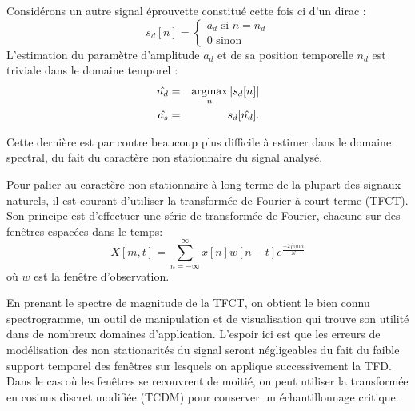 Considérons un autre signal \og éprouvette \fg constitué cette fois ci d'un dirac :
\begin{equation}
  s_d[n] = \begin{cases}
    a_d \text{ si } n=n_d \\
    0 \text{ sinon}
\end{cases}
\end{equation}
L'estimation du paramètre d'amplitude $a_d$ et de sa position temporelle $n_d$ est triviale dans le domaine temporel :
\begin{eqnarray}
  \hat{n_d} &=&  \operatorname*{argmax}_n | s_d[n] | \\
  \hat{a_s} &=&  s_d[\hat{n_d}].
\end{eqnarray}

Cette dernière est par contre beaucoup plus difficile à estimer dans le domaine spectral, du fait du caractère non stationnaire du signal analysé.

Pour palier au caractère non stationnaire à long terme de la plupart des signaux naturels, il est courant d'utiliser la transformée de Fourier à court terme (TFCT). Son principe est d'effectuer une série de transformée de Fourier, chacune sur des fenêtres espacées dans le temps:
\begin{equation}
X[m, t] = \sum_{n = - \infty}^{\infty} x[n] w[n-t] e^{\frac{-2 j  \pi m n}{N}}
\end{equation}
où $w$ est la fenêtre d'observation.


En prenant le spectre de magnitude de la TFCT, on obtient le bien connu spectrogramme, un outil de manipulation et de visualisation qui trouve son utilité dans de nombreux domaines d'application. L'espoir ici est que les erreurs de modélisation des non stationarités du signal seront négligeables du fait du faible support temporel des fenêtres sur lesquels on applique successivement la TFD. Dans le cas où les fenêtres se recouvrent de moitié, on peut utiliser la transformée en cosinus discret modifiée (TCDM) pour conserver un échantillonnage critique\cite{princen1986analysis}.

